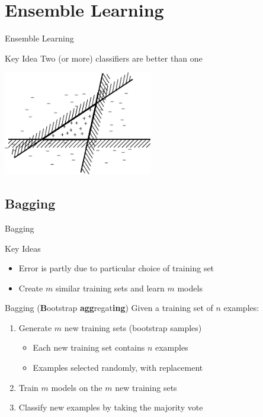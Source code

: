 \documentclass[14pt]{beamer}
\begin{document}
\section{Ensemble Learning}

\begin{frame}{Ensemble Learning}
\begin{block}{Key Idea}
Two (or more) classifiers are better than one
\end{block}
\begin{center}
\includegraphics[height=1.8in]{ensemble-expressiveness}
\end{center}
\end{frame}

\subsection{Bagging}

\begin{frame}[<+->]{Bagging}
\begin{block}{Key Ideas}
\begin{itemize}
\item Error is partly due to particular choice of training set
\item Create $m$ similar training sets and learn $m$ models
\end{itemize}
\end{block}
\begin{block}{Bagging (\textbf{B}ootstrap \textbf{agg}regat\textbf{ing})}
Given a training set of $n$ examples:
\begin{enumerate}
\item Generate $m$ new training sets (\alert{bootstrap samples})
\begin{itemize}
\item Each new training set contains $n$ examples
\item Examples selected randomly, with replacement
\end{itemize}
\item Train $m$ models on the $m$ new training sets
\item Classify new examples by taking the majority vote
\end{enumerate}
\end{block}
\end{frame}
\end{document}
